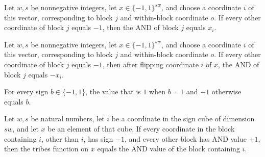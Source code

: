 \begin{theorem}
\label{FABL.andFunction_eq_of_restTrue}
\leanok
{}
Let $w,s$ be nonnegative integers, let $x\in\{-1,1\}^{sw}$, and choose a coordinate $i$
of this vector, corresponding to block $j$ and within-block coordinate $o$. If every
other coordinate of block $j$ equals $-1$, then the AND of block $j$ equals $x_i$.
\end{theorem}

\begin{theorem}
\label{FABL.andFunction_flip_eq_of_restTrue}
\leanok
{}
Let $w,s$ be nonnegative integers, let $x\in\{-1,1\}^{sw}$, and choose a coordinate $i$
of this vector, corresponding to block $j$ and within-block coordinate $o$. If every
other coordinate of block $j$ equals $-1$, then after flipping coordinate $i$ of $x$,
the AND of block $j$ equals $-x_i$.
\end{theorem}

\begin{theorem}
\label{FABL.sign_ite_eq_self}
\leanok
{}
For every sign $b\in\{-1,1\}$, the value that is $1$ when $b=1$ and $-1$ otherwise
equals $b$.
\end{theorem}

\begin{theorem}
\label{FABL.tribes_eq_and_of_restTrue_othersFalse}
\leanok
{}
Let $w,s$ be natural numbers, let $i$ be a coordinate in the sign cube of dimension
$sw$, and let $x$ be an element of that cube. If every coordinate in the block
containing $i$, other than $i$, has sign $-1$, and every other block has AND value $+1$,
then the tribes function on $x$ equals the AND value of the block containing $i$.
\end{theorem}

